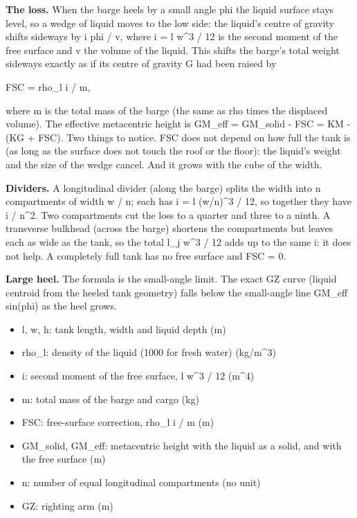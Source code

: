 \documentclass[11pt,a4paper]{article}
\begin{document}
\textbf{The loss.} When the barge heels by a small angle phi the liquid surface stays level, so a wedge of liquid moves to the low side: the liquid's centre of gravity shifts sideways by i phi / v, where i = l w\textasciicircum{}3 / 12 is the second moment of the free surface and v the volume of the liquid. This shifts the barge's total weight sideways exactly as if its centre of gravity G had been raised by

FSC = rho\_l i / m,

where m is the total mass of the barge (the same as rho times the displaced volume). The effective metacentric height is GM\_eff = GM\_solid - FSC = KM - (KG + FSC). Two things to notice. FSC does not depend on how full the tank is (as long as the surface does not touch the roof or the floor): the liquid's weight and the size of the wedge cancel. And it grows with the cube of the width.

\textbf{Dividers.} A longitudinal divider (along the barge) splits the width into n compartments of width w / n; each has i = l (w/n)\textasciicircum{}3 / 12, so together they have i / n\textasciicircum{}2. Two compartments cut the loss to a quarter and three to a ninth. A transverse bulkhead (across the barge) shortens the compartments but leaves each as wide as the tank, so the total l\_j w\textasciicircum{}3 / 12 adds up to the same i: it does not help. A completely full tank has no free surface and FSC = 0.

\textbf{Large heel.} The formula is the small-angle limit. The exact GZ curve (liquid centroid from the heeled tank geometry) falls below the small-angle line GM\_eff sin(phi) as the heel grows.

\begin{itemize}[nosep]
\item l, w, h: tank length, width and liquid depth (m)
\item rho\_l: density of the liquid (1000 for fresh water) (kg/m\textasciicircum{}3)
\item i: second moment of the free surface, l w\textasciicircum{}3 / 12 (m\textasciicircum{}4)
\item m: total mass of the barge and cargo (kg)
\item FSC: free-surface correction, rho\_l i / m (m)
\item GM\_solid, GM\_eff: metacentric height with the liquid as a solid, and with the free surface (m)
\item n: number of equal longitudinal compartments (no unit)
\item GZ: righting arm (m)
\end{itemize}
\end{document}
